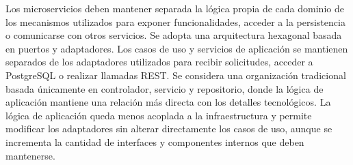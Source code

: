   {Los microservicios deben mantener separada la lógica propia de cada dominio de
  los mecanismos utilizados para exponer funcionalidades, acceder a la persistencia
  o comunicarse con otros servicios.}
  {Se adopta una arquitectura hexagonal basada en puertos y adaptadores. Los casos
  de uso y servicios de aplicación se mantienen separados de los adaptadores
  utilizados para recibir solicitudes, acceder a PostgreSQL o realizar llamadas
  REST.}
  {Se considera una organización tradicional basada únicamente en controlador,
  servicio y repositorio, donde la lógica de aplicación mantiene una relación más
  directa con los detalles tecnológicos.}
  {La lógica de aplicación queda menos acoplada a la infraestructura y permite
  modificar los adaptadores sin alterar directamente los casos de uso, aunque se
  incrementa la cantidad de interfaces y componentes internos que deben mantenerse.}
